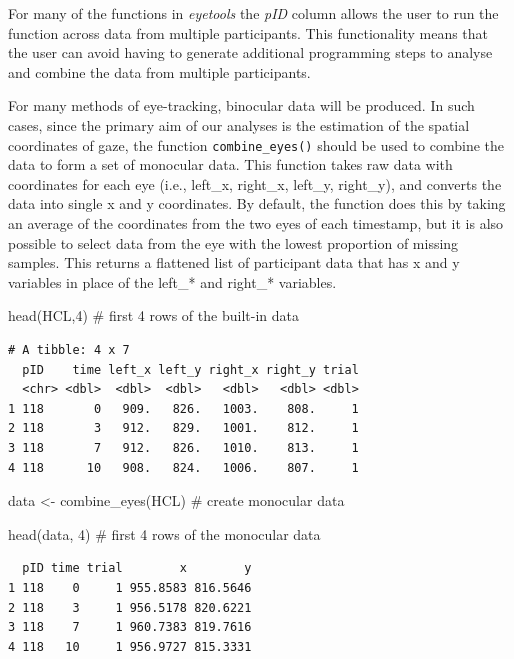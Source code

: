 \documentclass[
  man,
  floatsintext,
  longtable,
  nolmodern,
  notxfonts,
  notimes,
  colorlinks=true,linkcolor=blue,citecolor=blue,urlcolor=blue]{apa7}
\newenvironment{Shaded}{\begin{snugshade}}{\end{snugshade}}
\newcommand{\CommentTok}[1]{\textcolor[rgb]{0.37,0.37,0.37}{#1}}
\newcommand{\DecValTok}[1]{\textcolor[rgb]{0.68,0.00,0.00}{#1}}
\newcommand{\FunctionTok}[1]{\textcolor[rgb]{0.28,0.35,0.67}{#1}}
\newcommand{\NormalTok}[1]{\textcolor[rgb]{0.00,0.23,0.31}{#1}}
\newcommand{\OtherTok}[1]{\textcolor[rgb]{0.00,0.23,0.31}{#1}}
\begin{document}
For many of the functions in \emph{eyetools} the \emph{pID} column
allows the user to run the function across data from multiple
participants. This functionality means that the user can avoid having to
generate additional programming steps to analyse and combine the data
from multiple participants.

For many methods of eye-tracking, binocular data will be produced. In
such cases, since the primary aim of our analyses is the estimation of
the spatial coordinates of gaze, the function \texttt{combine\_eyes()}
should be used to combine the data to form a set of monocular data. This
function takes raw data with coordinates for each eye (i.e., left\_x,
right\_x, left\_y, right\_y), and converts the data into single x and y
coordinates. By default, the function does this by taking an average of
the coordinates from the two eyes of each timestamp, but it is also
possible to select data from the eye with the lowest proportion of
missing samples. This returns a flattened list of participant data that
has x and y variables in place of the left\_* and right\_* variables.

\begin{Shaded}
\begin{Highlighting}[]
\FunctionTok{head}\NormalTok{(HCL,}\DecValTok{4}\NormalTok{) }\CommentTok{\# first 4 rows of the built{-}in data}
\end{Highlighting}
\end{Shaded}

\begin{verbatim}
# A tibble: 4 x 7
  pID    time left_x left_y right_x right_y trial
  <chr> <dbl>  <dbl>  <dbl>   <dbl>   <dbl> <dbl>
1 118       0   909.   826.   1003.    808.     1
2 118       3   912.   829.   1001.    812.     1
3 118       7   912.   826.   1010.    813.     1
4 118      10   908.   824.   1006.    807.     1
\end{verbatim}

\begin{Shaded}
\begin{Highlighting}[]
\NormalTok{data }\OtherTok{\textless{}{-}} \FunctionTok{combine\_eyes}\NormalTok{(HCL) }\CommentTok{\# create monocular data }

\FunctionTok{head}\NormalTok{(data, }\DecValTok{4}\NormalTok{) }\CommentTok{\# first 4 rows of the monocular data}
\end{Highlighting}
\end{Shaded}

\begin{verbatim}
  pID time trial        x        y
1 118    0     1 955.8583 816.5646
2 118    3     1 956.5178 820.6221
3 118    7     1 960.7383 819.7616
4 118   10     1 956.9727 815.3331
\end{verbatim}
\end{document}
